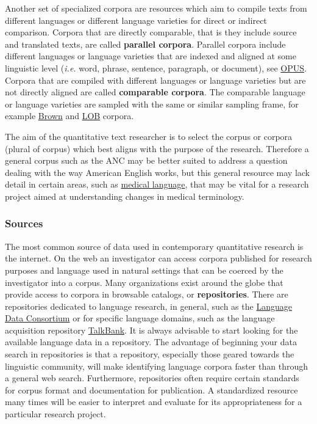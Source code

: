\documentclass[
  letterpaper,
]{latex/krantz}
\begin{document}
Another set of specialized corpora are resources which aim to compile
texts from different languages or different language varieties for
direct or indirect comparison. Corpora that are directly comparable,
that is they include source and translated texts, are called
\textbf{parallel corpora}. Parallel corpora include different languages
or language varieties that are indexed and aligned at some linguistic
level (\emph{i.e.} word, phrase, sentence, paragraph, or document), see
\href{https://opus.nlpl.eu/}{OPUS}. Corpora that are compiled with
different languages or language varieties but are not directly aligned
are called \textbf{comparable corpora}. The comparable language or
language varieties are sampled with the same or similar sampling frame,
for example
\href{https://ota.bodleian.ox.ac.uk/repository/xmlui/handle/20.500.12024/0402}{Brown}
and
\href{https://ota.bodleian.ox.ac.uk/repository/xmlui/handle/20.500.12024/0167}{LOB}
corpora.

The aim of the quantitative text researcher is to select the corpus or
corpora (plural of corpus) which best aligns with the purpose of the
research. Therefore a general corpus such as the ANC may be better
suited to address a question dealing with the way American English
works, but this general resource may lack detail in certain areas, such
as \href{http://www.hd.uib.no/icame/ij22/vihla.pdf}{medical language},
that may be vital for a research project aimed at understanding changes
in medical terminology.

\hypertarget{sources}{%
\subsubsection{Sources}\label{sources}}

The most common source of data used in contemporary quantitative
research is the internet. On the web an investigator can access corpora
published for research purposes and language used in natural settings
that can be coerced by the investigator into a corpus. Many
organizations exist around the globe that provide access to corpora in
browsable catalogs, or \textbf{repositories}. There are repositories
dedicated to language research, in general, such as the
\href{https://www.ldc.upenn.edu/}{Language Data Consortium} or for
specific language domains, such as the language acquisition repository
\href{http://talkbank.org/}{TalkBank}. It is always advisable to start
looking for the available language data in a repository. The advantage
of beginning your data search in repositories is that a repository,
especially those geared towards the linguistic community, will make
identifying language corpora faster than through a general web search.
Furthermore, repositories often require certain standards for corpus
format and documentation for publication. A standardized resource many
times will be easier to interpret and evaluate for its appropriateness
for a particular research project.
\end{document}
